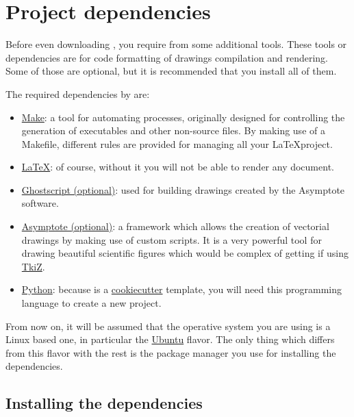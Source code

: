 \section{Project dependencies}

Before even downloading \ESCRIBA, you require from some additional tools. These
tools or dependencies are for code formatting of drawings compilation and
rendering. Some of those are optional, but it is recommended that you install
all of them.

The required dependencies by \ESCRIBA are:

\begin{itemize}
  \item \href{https://www.gnu.org/software/make/}{Make}: a tool for automating
        processes, originally designed for controlling the generation of
        executables and other non-source files. By making use of a Makefile,
        different rules are provided for managing all your \LaTeX project.
  \item \href{https://www.latex-project.org/}{\LaTeX}: of course, without it you
        will not be able to render any document.
  \item \href{https://www.ghostscript.com/}{Ghostscript (optional)}: used for building
        drawings created by the Asymptote software.
  \item \href{https://asymptote.sourceforge.io/}{Asymptote (optional)}: a framework which
        allows the creation of vectorial drawings by making use of custom
        scripts. It is a very powerful tool for drawing beautiful scientific
        figures which would be complex of getting if using
        \href{https://es.overleaf.com/learn/latex/TikZ_package}{TkiZ}.
  \item \href{https://www.python.org/}{Python}: because \ESCRIBA is a
        \href{https://github.com/cookiecutter/cookiecutter}{cookiecutter} template, you will need this programming
        language to create a new project.
\end{itemize}

From now on, it will be assumed that the operative system you are using is a
Linux based one, in particular the \href{https://ubuntu.com/download}{Ubuntu}
flavor. The only thing which differs from this flavor with the rest is the
package manager you use for installing the dependencies.

\subsection{Installing the dependencies}


